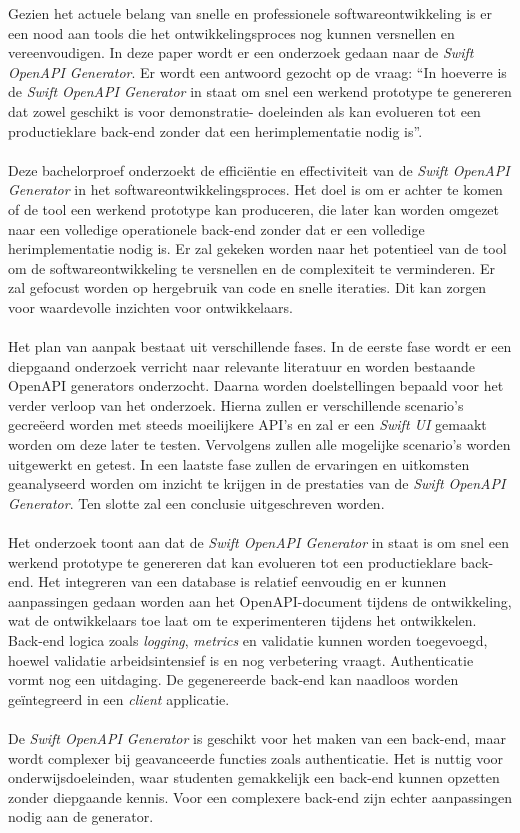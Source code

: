Gezien het actuele belang van snelle en professionele softwareontwikkeling is er een nood aan tools die het ontwikkelingsproces nog kunnen versnellen en vereenvoudigen. In deze paper wordt er een onderzoek gedaan naar de \textit{Swift OpenAPI Generator}. Er wordt een antwoord gezocht op de vraag: “In hoeverre is de \textit{Swift OpenAPI Generator} in staat om snel een werkend prototype te genereren dat zowel geschikt is voor demonstratie- doeleinden als kan evolueren tot een productieklare back-end zonder dat een herimplementatie nodig is”.
\\ \\
Deze bachelorproef onderzoekt de efficiëntie en effectiviteit van de  \textit{Swift OpenAPI Generator} in het softwareontwikkelingsproces. Het doel is om er achter te komen of de tool een werkend prototype kan produceren, die later kan worden omgezet naar een volledige operationele back-end zonder dat er een volledige herimplementatie nodig is. Er zal gekeken worden naar het potentieel van de tool om de softwareontwikkeling te versnellen en de complexiteit te verminderen. Er zal gefocust worden op hergebruik van code en snelle iteraties. Dit kan zorgen voor waardevolle inzichten voor ontwikkelaars. 
\\ \\
Het plan van aanpak bestaat uit verschillende fases. In de eerste fase wordt er een diepgaand onderzoek verricht naar relevante literatuur en worden bestaande OpenAPI generators onderzocht. Daarna worden doelstellingen bepaald voor het verder verloop van het onderzoek. Hierna zullen er verschillende scenario’s gecreëerd worden met steeds moeilijkere API’s en zal er een \textit{Swift UI} gemaakt worden om deze later te testen. 
Vervolgens zullen alle mogelijke scenario’s worden uitgewerkt en getest. In een laatste fase zullen de ervaringen en uitkomsten geanalyseerd worden om inzicht te krijgen in de prestaties van de \textit{Swift OpenAPI Generator}. Ten slotte zal een conclusie uitgeschreven worden. 
\\ \\
Het onderzoek toont aan dat de \textit{Swift OpenAPI Generator} in staat is om snel een werkend prototype te genereren dat kan evolueren tot een productieklare back-end. Het integreren van een database is relatief eenvoudig en er kunnen aanpassingen gedaan worden aan het OpenAPI-document tijdens de ontwikkeling, wat de ontwikkelaars toe laat om te experimenteren tijdens het ontwikkelen. 
Back-end logica zoals \textit{logging}, \textit{metrics} en validatie kunnen worden toegevoegd, hoewel validatie arbeidsintensief is en nog verbetering vraagt. Authenticatie vormt nog een uitdaging. De gegenereerde back-end kan naadloos worden geïntegreerd in een \textit{client} applicatie.
\\ \\
De \textit{Swift OpenAPI Generator} is geschikt voor het maken van een back-end, maar wordt complexer bij geavanceerde functies zoals authenticatie. Het is nuttig voor onderwijsdoeleinden, waar studenten gemakkelijk een back-end kunnen opzetten zonder diepgaande kennis. Voor een complexere back-end zijn echter aanpassingen nodig aan de generator.

